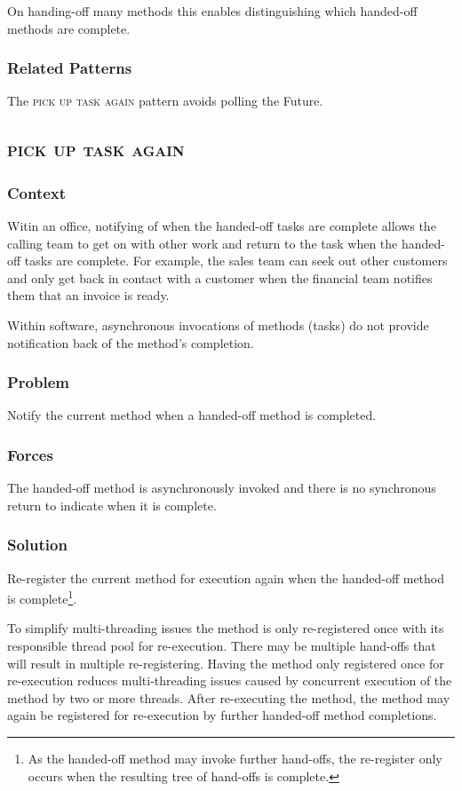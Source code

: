 \documentclass[prodmode]{style/acmlarge}
\begin{document}
On handing-off many methods this enables distinguishing which handed-off methods
are complete.

\subsubsection*{Related Patterns} The \textsc{pick up task again} pattern avoids
polling the Future.



\subsection{\textsc{\textbf{pick up task again}}}

\subsubsection*{Context} Witin an office, notifying of when the handed-off tasks
are complete allows the calling team to get on with other work and return to the
task when the handed-off tasks are complete.  For example, the sales team can
seek out other customers and only get back in contact with a customer when the
financial team notifies them that an invoice is ready.

Within software, asynchronous invocations of methods (tasks) do not provide
notification back of the method's completion.

\subsubsection*{\textbf{Problem}} Notify the current method when a handed-off method is
completed.

\subsubsection*{Forces} The handed-off method is asynchronously invoked and there is
no synchronous return to indicate when it is complete.

\subsubsection*{\textbf{Solution}} Re-register the current method for execution again
when the handed-off method is complete\footnote{As the handed-off method may
invoke further hand-offs, the re-register only occurs when the resulting tree of
hand-offs is complete.}.

To simplify multi-threading issues the method is only re-registered once with
its responsible thread pool for re-execution.  There may be multiple hand-offs
that will result in multiple re-registering.  Having the method only registered
once for re-execution reduces multi-threading issues caused by concurrent
execution of the method by two or more threads.  After re-executing the method,
the method may again be registered for re-execution by further handed-off method
completions.
\end{document}
